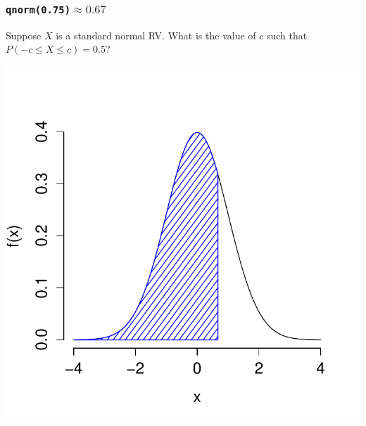 \documentclass[handout]{beamer}
\begin{document}
\begin{frame}
\frametitle{\texttt{qnorm(0.75)}$\approx 0.67$}
Suppose $X$ is a standard normal RV. What is the value of $c$ such that $P(-c \leq X\leq c ) = 0.5$?
\begin{center}
\includegraphics[scale = 0.55]{./images/tail2}
\end{center}
\end{frame}
\end{document}
